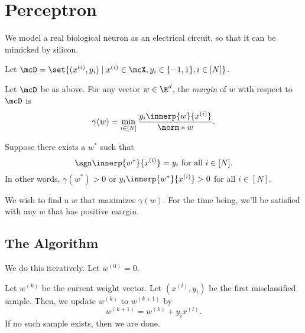 \chapter{Perceptron} \label{chp:perceptron}
We model a real biological neuron as an electrical circuit, so that it can
be mimicked by silicon.
\begin{center}
\end{center}

Let $\mcD = \set{(x^{(i)}, y_i) \mid x^{(i)} \in \mcX, y_i \in \pms,
                                i \in [N]}$.
\begin{definition*}[Margin] \label{def:margin}
    Let $\mcD$ be as above.
    For any vector $w \in \R^d$, the \emph{margin} of $w$ with respect to
    $\mcD$ is \[
        \gamma(w) = \min_{i \in [N]} \frac{y_i \innerp{w}{x^{(i)}}}{\norm*{w}}.
    \]
\end{definition*}

Suppose there exists a $w^*$ such that \[
    \sgn \innerp{w^*}{x^{(i)}} = y_i \text{ for all } i \in [N].
\]
In other words, $\gamma(w^*) > 0$ or $y_i \innerp{w^*}{x^{(i)}} > 0$ for all
$i \in [N]$.

We wish to find a $w$ that maximizes $\gamma(w)$.
For the time being, we'll be satisfied with any $w$ that has positive margin.

\section{The Algorithm} \label{sec:perceptron:algo}

We do this iteratively.
Let $w^{(0)} = 0$.

Let $w^{(k)}$ be the current weight vector.
Let $(x^{(l)}, y_i)$ be the first misclassified sample.
Then, we update $w^{(k)}$ to $w^{(k+1)}$ by \[
    w^{(k+1)} = w^{(k)} + y_i x^{(l)}.
\] If no such sample exists, then we are done.

